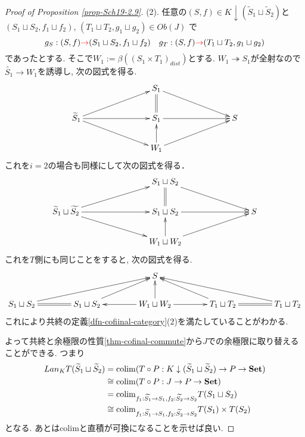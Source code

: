 \documentclass[dvipdfmx,a4paper,11pt]{article}
\newcommand{\colim}{{\rm colim}}
\theoremstyle{definition}
\newcommand{\xr}[1]{\textcolor{red}{#1}}
\begin{document}
\begin{proof}[Proof of Proposition \ref{prop-Sch19-2.9}]
(2). 任意の$(S, f) \in K \downarrow  (\widetilde{S}_1 \sqcup  \widetilde{S}_2)$と
$(S_1 \sqcup  S_2, f_1 \sqcup  f_2)$, $(T_1 \sqcup  T_2, g_1 \sqcup  g_2) \in Ob(J)$ で
$$
g_{S} : (S, f) \xr{\to}(S_1 \sqcup  S_2, f_1 \sqcup  f_2)
\quad
g_{T} : (S, f) \xr{\to}(T_1 \sqcup  T_2, g_1 \sqcup  g_2)
$$
であったとする.
そこで$W_1 := \beta((S_1\times T_1)_{dist})$とする.
$W_1 \twoheadrightarrow S_1$が全射なので$\widetilde{S_1} \to W_1$を誘導し, 次の図式を得る. 
\begin{equation*}
\label{eq-conti}
\xymatrix@C=78pt@R=20pt{
&S_1 \ar@{->}[rd]\ar@{=}[d]
& 
\\
\widetilde{S}_1 
 \ar@{->}[r] \ar@{->}[rd]\ar@{->}[ru]
&S_1  \ar@{->}[r] 
& S
\\
&W_1 \ar@{->}[ru] \ar@{->}[u]
& 
\\
}
\end{equation*}
これを$i=2$の場合も同様にして次の図式を得る．
\begin{equation*}
\label{eq-conti}
\xymatrix@C=78pt@R=20pt{
&S_1\sqcup S_2 \ar@{->}[rd]\ar@{=}[d]
& 
\\
\widetilde{S}_1 \sqcup \widetilde{S_2}
 \ar@{->}[r] \ar@{->}[rd]\ar@{->}[ru]
&S_1 \sqcup S_2  \ar@{->}[r] 
& S
\\
&W_1\sqcup W_2 \ar@{->}[ru] \ar@{->}[u]
& 
\\
}
\end{equation*}
これを$T$側にも同じことをすると, 次の図式を得る. 
\begin{equation*}
\label{eq-conti}
\xymatrix@C=40pt@R=20pt{
&
&
S&
&
\\
S_1 \sqcup S_2\ar@{->}[rru] \ar@{=}[r]&
S_1 \sqcup S_2\ar@{->}[ru]&
W_1 \sqcup W_2\ar@{->}[u] \ar@{->}[r] \ar@{->}[l]&
T_1 \sqcup T_2\ar@{->}[lu]\ar@{=}[r]&
T_1 \sqcup T_2 \ar@{->}[llu]
}
\end{equation*}
これにより共終の定義\ref{dfn-cofiinal-category}(2)を満たしていることがわかる.

よって共終と余極限の性質\ref{thm-cofinal-commute}から$J$での余極限に取り替えることができる. つまり
\begin{align*}
\begin{split}
Lan_{K}T (\widetilde{S}_1 \sqcup  \widetilde{S}_2) 
&=
\colim(T \circ P : K \downarrow  (\widetilde{S}_1 \sqcup  \widetilde{S}_2) \to P \to {\bf Set}) \\
&\cong
\colim(T \circ P : J   \to P \to {\bf Set}) \\
&=
\colim_{f_1: \widetilde{S_1} \to S_1,  f_2: \widetilde{S_2} \to S_2} T(S_1 \sqcup  S_2) \\
& \cong 
\colim_{f_1 : \widetilde{S_1} \to S_1,  f_2: \widetilde{S_2} \to S_2} T(S_1) \times  T( S_2)
\end{split}
\end{align*}
となる.
あとはcolimと直積が可換になることを示せば良い.


\end{proof}
\end{document}
